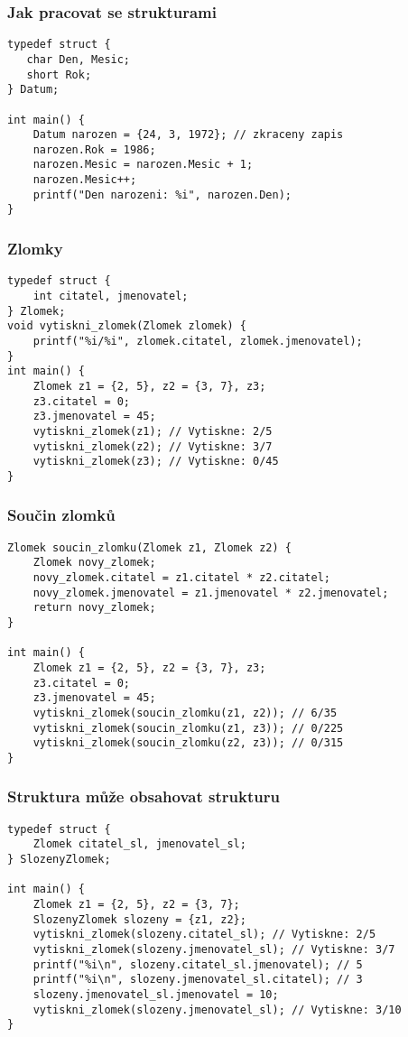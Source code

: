 \documentclass{beamer}
\begin{document}
\begin{frame}[t,fragile]\frametitle{Jak pracovat se strukturami} 
\begin{verbatim} 
typedef struct {
   char Den, Mesic; 
   short Rok;
} Datum;

int main() {
    Datum narozen = {24, 3, 1972}; // zkraceny zapis
    narozen.Rok = 1986;
    narozen.Mesic = narozen.Mesic + 1;
    narozen.Mesic++;
    printf("Den narozeni: %i", narozen.Den);
}
\end{verbatim}
\end{frame}


\begin{frame}[t,fragile]\frametitle{Zlomky} 
\begin{verbatim} 
typedef struct {
    int citatel, jmenovatel;
} Zlomek;
void vytiskni_zlomek(Zlomek zlomek) {
    printf("%i/%i", zlomek.citatel, zlomek.jmenovatel);
}
int main() {
    Zlomek z1 = {2, 5}, z2 = {3, 7}, z3;
    z3.citatel = 0;
    z3.jmenovatel = 45;
    vytiskni_zlomek(z1); // Vytiskne: 2/5
    vytiskni_zlomek(z2); // Vytiskne: 3/7
    vytiskni_zlomek(z3); // Vytiskne: 0/45
}
\end{verbatim}
\end{frame}


\begin{frame}[t,fragile]\frametitle{Součin zlomků} 
\begin{verbatim} 
Zlomek soucin_zlomku(Zlomek z1, Zlomek z2) {
    Zlomek novy_zlomek;
    novy_zlomek.citatel = z1.citatel * z2.citatel;
    novy_zlomek.jmenovatel = z1.jmenovatel * z2.jmenovatel;
    return novy_zlomek;
}

int main() {
    Zlomek z1 = {2, 5}, z2 = {3, 7}, z3;
    z3.citatel = 0;
    z3.jmenovatel = 45;
    vytiskni_zlomek(soucin_zlomku(z1, z2)); // 6/35
    vytiskni_zlomek(soucin_zlomku(z1, z3)); // 0/225
    vytiskni_zlomek(soucin_zlomku(z2, z3)); // 0/315
}
\end{verbatim}
\end{frame}



\begin{frame}[t,fragile]\frametitle{Struktura může obsahovat strukturu} 
\begin{verbatim} 
typedef struct {
    Zlomek citatel_sl, jmenovatel_sl;
} SlozenyZlomek;

int main() {
    Zlomek z1 = {2, 5}, z2 = {3, 7};
    SlozenyZlomek slozeny = {z1, z2};
    vytiskni_zlomek(slozeny.citatel_sl); // Vytiskne: 2/5
    vytiskni_zlomek(slozeny.jmenovatel_sl); // Vytiskne: 3/7
    printf("%i\n", slozeny.citatel_sl.jmenovatel); // 5
    printf("%i\n", slozeny.jmenovatel_sl.citatel); // 3
    slozeny.jmenovatel_sl.jmenovatel = 10;
    vytiskni_zlomek(slozeny.jmenovatel_sl); // Vytiskne: 3/10
}
\end{verbatim}
\end{frame}
\end{document}
